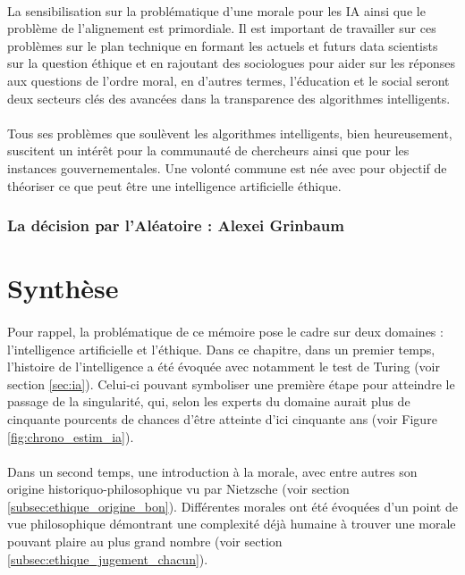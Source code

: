 \documentclass[10pt, french, a4paper]{report}
\begin{document}
\paragraph{}
La sensibilisation sur la problématique d’une morale pour les IA ainsi que le problème de l’alignement est primordiale. Il est important de travailler sur ces problèmes sur le plan technique en formant les actuels et futurs data scientists sur la question éthique et en rajoutant des sociologues pour aider sur les réponses aux questions de l’ordre moral, en d’autres termes, l’éducation et le social seront deux secteurs clés des avancées dans la transparence des algorithmes intelligents.

\paragraph{}
Tous ses problèmes que soulèvent les algorithmes intelligents, bien heureusement, suscitent un intérêt pour la communauté de chercheurs ainsi que pour les instances gouvernementales. Une volonté commune est née avec pour objectif de théoriser ce que peut être une intelligence artificielle éthique.

\subsubsection{La décision par l'Aléatoire : Alexei Grinbaum}

\section{Synthèse}

\paragraph{}
Pour rappel, la problématique de ce mémoire pose le cadre sur deux domaines : l’intelligence artificielle et l’éthique. Dans ce chapitre, dans un premier temps, l’histoire de l’intelligence a été évoquée avec notamment le test de Turing (voir section \ref{sec:ia}). Celui-ci pouvant symboliser une première étape pour atteindre le passage de la singularité, qui, selon les experts du domaine aurait plus de cinquante pourcents de chances d’être atteinte d’ici cinquante ans (voir Figure \ref{fig:chrono_estim_ia}).

\paragraph{}
Dans un second temps, une introduction à la morale, avec entre autres son origine historiquo-philosophique vu par Nietzsche (voir section \ref{subsec:ethique_origine_bon}). Différentes morales ont été évoquées d’un point de vue philosophique démontrant une complexité déjà humaine à trouver une morale pouvant plaire au plus grand nombre (voir section \ref{subsec:ethique_jugement_chacun}).
\end{document}
